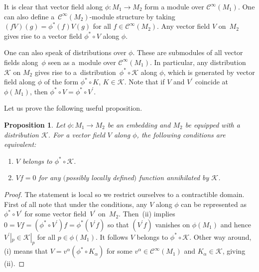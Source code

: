 \documentclass[10pt,a4paper]{amsart}
\numberwithin{equation}{section}
\newtheorem{Proposition}[Theorem]{Proposition}
\theoremstyle{definition}
\newcommand{\cC}{\mathcal{C}}
\def\cK{\mathcal{K}}
\begin{document}
It is clear that vector field along $\phi\colon M_1\rightarrow M_2$ form a module over $\cC^{\infty}(M_1)$. One can also define a~$\cC^{\infty}(M_2)$-module structure by taking $(fV)(g)=\phi^*(f)V(g)$ for all $f\in \cC^{\infty}(M_2)$. Any vector field $V$ on~$M_2$ gives rise to a vector field $\phi^*\circ V$ along $\phi$.

One can also speak of distributions over $\phi$. These are submodules of all vector fields along~$\phi$ seen as a~module over $\cC^\infty(M_1)$. In particular, any distribution $\cK$ on $M_2$ gives rise to a~distribution~${\phi^*\circ \cK}$ along $\phi$, which is generated by vector field along $\phi$ of the form $\phi^*\circ K$, $K\in \cK$. Note that if $V$ and $V^\prime$ coincide at $\phi(M_1)$, then $\phi^*\circ V=\phi^*\circ V^\prime$.

Let us prove the following useful proposition.

\begin{Proposition}\label{prop2}
 Let $\phi\colon M_1\rightarrow M_2$ be an embedding
 and $M_2$ be equipped with a distribution $\mathcal{K}$. For a vector field $V$ along $\phi$, the following conditions are equivalent:
 \begin{enumerate}\itemsep=0pt
 \item[$(i)$] $V$ belongs to $\phi^*\circ \cK$.
 \item[$(ii)$] $Vf=0$ for any $($possibly locally defined$)$ function annihilated by $\cK$.
 \end{enumerate}
\end{Proposition}
\begin{proof}
The statement is local so we restrict ourselves to a contractible domain. First of all note that under the conditions, any $V$ along $\phi$ can be represented as $\phi^*\circ V^\prime$ for some vector field~$V^\prime$ on~$M_2$. Then~(ii) implies $0=Vf=(\phi^*\circ V^\prime) f=\phi^*(V^\prime f)$ so that $(V^\prime f)$ vanishes on $\phi(M_1)$ and hence $V^\prime|_p\in \cK|_p$ for all $p \in \phi(M_1)$. It follows $V$ belongs to $\phi^*\circ \cK$.
Other way around, (i) means that $V=v^\alpha (\phi^*\circ K_\alpha)$ for some $v^\alpha \in\cC^{\infty}(M_1)$ and $K_\alpha \in \cK$, giving (ii).
\end{proof}
\end{document}
